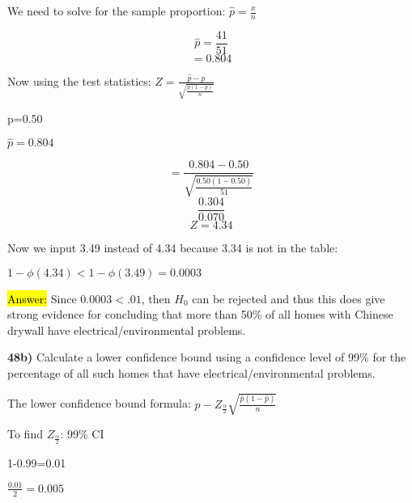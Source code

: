 \documentclass{article}
\begin{document}
\vspace{2mm}

We need to solve for the sample proportion: $\hat{p}=\frac{x}{n}$

$$\hat{p}=\frac{41}{51}$$
$$=0.804$$

Now using the test statistics: $Z=\frac{\hat{p}-p}{\sqrt{\frac{p(1-p)}{n}}}$

\vspace{2mm}

p=0.50

\vspace{2mm}

$\hat{p}=0.804$

\vspace{2mm}

$$=\frac{0.804-0.50}{\sqrt{\frac{0.50(1-0.50)}{51}}}$$
$$\frac{0.304}{0.070}$$
$$Z=4.34$$

Now we input 3.49 instead of 4.34 because 3.34 is not in the table:

\vspace{2mm}

$1-\phi(4.34)<1-\phi(3.49)=0.0003$

\vspace{2mm}

\hl{Answer:} Since $0.0003 < .01$, then $H_{0}$ can be rejected and thus this does give strong evidence for concluding that more than 50\% of all homes with Chinese drywall have electrical/environmental problems.



\vspace{5mm}

\textbf{48b)} Calculate a lower confidence bound using a confidence level of 99\% for the percentage of all such homes that have electrical/environmental problems.

The lower confidence bound formula: $\hat{p}-Z_{\frac{\alpha}{2}}\sqrt{\frac{\hat{p}(1-\hat{p})}{n}}$

\vspace{2mm}

To find $Z_{\frac{\alpha}{2}}$: 99\% CI

\vspace{2mm}

1-0.99=0.01

\vspace{2mm}

$\frac{0.01}{2}=0.005$

\vspace{2mm}
\end{document}
